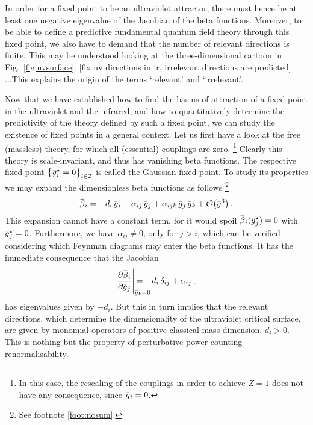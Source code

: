 \documentclass[11pt]{book}
\newcommand{\overbar}[1]{\mkern 1.5mu\overline{\mkern-1.5mu#1\mkern-1.5mu}\mkern 1.5mu}
\numberwithin{equation}{chapter}
\begin{document}
In order for a fixed point to be an ultraviolet attractor,
there must hence be at least one negative eigenvalue
of the Jacobian of the beta functions. Moreover,
to be able to define a predictive fundamental
quantum field theory through this fixed point,
we also have to demand that the number of relevant
directions is finite. This may be understood looking
at the three-dimensional cartoon in Fig.~\ref{fig:uvsurface}.
[fix uv directions in ir, irrelevant directions are
predicted]
...This explains the origin of the terms `relevant'
and `irrelevant'.

Now that we have established how to find the basins
of attraction of a fixed point in the ultraviolet and the infrared,
and how to quantitatively determine the predictivity
of the theory defined by such a fixed point,
we can study the existence of fixed points
in a general context.
Let us first have a look at the
free (massless) theory, for which
all (essential) couplings are zero.%
\footnote{
  In this case, the rescaling of the couplings
  in order to achieve $Z=1$ does not have any consequence,
  since $\overbar g_i = 0$.
}
Clearly this
theory is scale-invariant, and thus has vanishing
beta functions. The respective fixed point
$\big\lbrace \overbar g_i^\star = 0 \big\rbrace_{i \in \mathcal I}$
is called the Gaussian fixed point.
To study its properties we may expand the dimensionless
beta functions as follows%
\footnote{
  See footnote \ref{foot:nosum}.
}
\begin{align}
  \overbar \beta_i =
  - d_i \, \overbar g_i
  + \alpha_{ij} \, \overbar g_j
  + \alpha_{ijk} \, \overbar g_j \, \overbar g_k
  + \mathcal O \big( \overbar g^3 \big) \,.
\end{align}
This expansion cannot have a constant term, for
it would spoil
$\overbar \beta_i(\overbar g_j^\star) = 0$
with $\overbar g_j^\star = 0$.
Furthermore, we have $\alpha_{ij} \neq 0$,
only for $j>i$,
which can be verified
considering which Feynman diagrams may enter the
beta functions.
It has the immediate consequence that the Jacobian
\begin{align}
  \frac{ \partial \overbar \beta_i }{ \partial \overbar g_j}
  \Bigg|_{ \overbar g_k = 0 }
  \hspace{-7mm}
  = - d_i \, \delta_{ij} + \alpha_{ij} \,,
\end{align}
has eigenvalues given by $-d_i$.
But this in turn implies that the relevant directions,
which determine the dimensionality of the ultraviolet critical surface,
are given by monomial operators of positive classical mass dimension,
$d_i > 0$.
This is nothing but the property of perturbative power-counting renormalisability.
\end{document}
